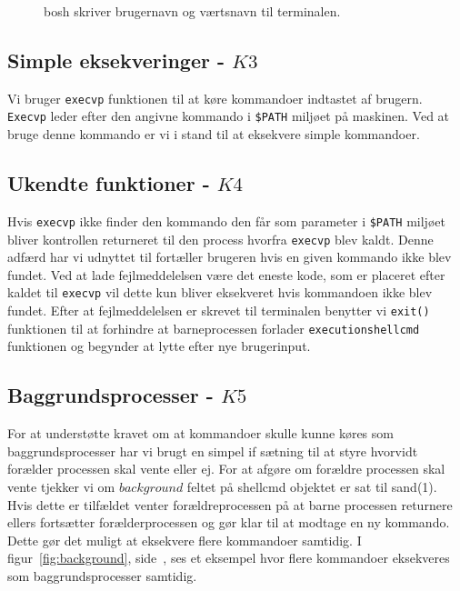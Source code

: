 \documentclass[final]{article}
\begin{document}
\begin{figure}[H]
\caption{bosh skriver brugernavn og værtsnavn til terminalen.}
\label{fig:opstart}
\end{figure}

\subsection{Simple eksekveringer - $K3$}
Vi bruger \texttt{execvp} funktionen til at køre kommandoer indtastet af brugern. \texttt{Execvp} leder efter den angivne kommando i \texttt{\$PATH} miljøet på maskinen. Ved at bruge denne kommando er vi i stand til at eksekvere simple kommandoer. 

\subsection{Ukendte funktioner - $K4$}
Hvis \texttt{execvp} ikke finder den kommando den får som parameter i \texttt{\$PATH} miljøet bliver kontrollen returneret til den process hvorfra \texttt{execvp} blev kaldt. Denne adfærd har vi udnyttet til fortæller brugeren hvis en given kommando ikke blev fundet. Ved at lade fejlmeddelelsen være det eneste kode, som er placeret efter kaldet til \texttt{execvp} vil dette kun bliver eksekveret hvis kommandoen ikke blev fundet. Efter at fejlmeddelelsen er skrevet til terminalen benytter vi \texttt{exit()} funktionen til at forhindre at barneprocessen forlader \texttt{executionshellcmd} funktionen og begynder at lytte efter nye brugerinput.

\subsection{Baggrundsprocesser - $K5$}
For at understøtte kravet om at kommandoer skulle kunne køres som baggrundsprocesser har vi brugt en simpel if sætning til at styre hvorvidt forælder processen skal vente eller ej. For at afgøre om forældre processen skal vente tjekker vi om $background$ feltet på shellcmd objektet er sat til sand(1). Hvis dette er tilfældet venter forældreprocessen på at barne processen returnere ellers fortsætter forælderprocessen og gør klar til at modtage en ny kommando. Dette gør det muligt at eksekvere flere kommandoer samtidig.  I figur~\ref{fig:background}, side~\pageref{fig:background}, ses et eksempel hvor flere kommandoer eksekveres som baggrundsprocesser samtidig.
\end{document}
